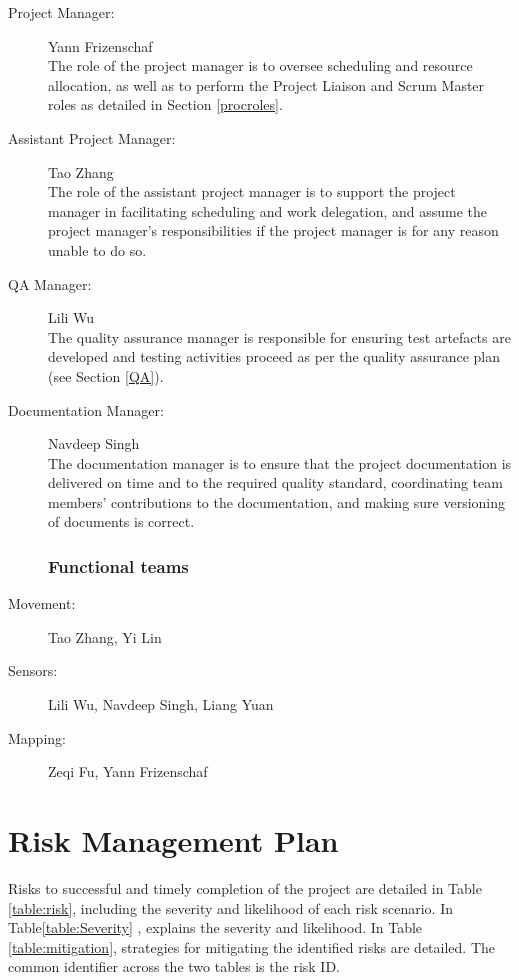 \documentclass[12pt]{article}
\begin{document}
\begin{description}
\item[{Project Manager:}]Yann Frizenschaf \\
The role of the project manager is to oversee scheduling and resource allocation, as well as to perform the Project Liaison and Scrum Master roles as detailed in Section \ref{procroles}.

\item[{Assistant Project Manager:}]Tao Zhang \\
The role of the assistant project manager is to support the project manager in facilitating scheduling and work delegation, and assume the project manager's responsibilities if the project manager is for any reason unable to do so.

\item[{QA Manager:}]Lili Wu \\
The quality assurance manager is responsible for ensuring test artefacts are developed and testing activities proceed as per the quality assurance plan (see Section \ref{QA}).

\item[{Documentation Manager:}]Navdeep Singh \\
The documentation manager is to ensure that the project documentation is delivered on time and to the required quality standard, coordinating team members' contributions to the documentation, and making sure versioning of documents is correct.

\subsubsection{Functional teams}

\item[{Movement:}]Tao Zhang, Yi Lin

\item [{Sensors:}]Lili Wu, Navdeep Singh, Liang Yuan

\item[{Mapping:}]Zeqi Fu, Yann Frizenschaf

\end{description}

\section{Risk Management Plan}
Risks to successful and timely completion of the project are detailed in Table \ref{table:risk}, including the severity and likelihood of each risk scenario.  In Table\ref{table:Severity} , explains the severity and likelihood.  In Table \ref{table:mitigation}, strategies for mitigating the identified risks are detailed. The common identifier across the two tables is the risk ID. 
\end{document}

